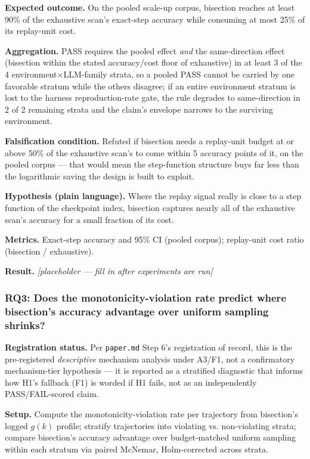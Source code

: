 \documentclass[11pt]{article}
\newcommand{\ph}{\textit{[placeholder --- fill in after experiments are run]}}
\begin{document}
\textbf{Expected outcome.} On the pooled scale-up corpus, bisection reaches at least 90\% of the exhaustive scan's exact-step accuracy while consuming at most 25\% of its replay-unit cost.

\textbf{Aggregation.} PASS requires the pooled effect \emph{and} the same-direction effect (bisection within the stated accuracy/cost floor of exhaustive) in at least 3 of the 4 environment$\times$LLM-family strata, so a pooled PASS cannot be carried by one favorable stratum while the others disagree; if an entire environment stratum is lost to the harness reproduction-rate gate, the rule degrades to same-direction in 2 of 2 remaining strata and the claim's envelope narrows to the surviving environment.

\textbf{Falsification condition.} Refuted if bisection needs a replay-unit budget at or above 50\% of the exhaustive scan's to come within 5 accuracy points of it, on the pooled corpus --- that would mean the step-function structure buys far less than the logarithmic saving the design is built to exploit.

\textbf{Hypothesis (plain language).} Where the replay signal really is close to a step function of the checkpoint index, bisection captures nearly all of the exhaustive scan's accuracy for a small fraction of its cost.

\textbf{Metrics.} Exact-step accuracy and 95\% CI (pooled corpus); replay-unit cost ratio (bisection / exhaustive).

\textbf{Result.} \ph

\subsubsection{RQ3: Does the monotonicity-violation rate predict where bisection's accuracy advantage over uniform sampling shrinks?}
\textbf{Registration status.} Per \texttt{paper.md} Step 6's registration of record, this is the pre-registered \emph{descriptive} mechanism analysis under A3/F1, not a confirmatory mechanism-tier hypothesis --- it is reported as a stratified diagnostic that informs how H1's fallback (F1) is worded if H1 fails, not as an independently PASS/FAIL-scored claim.

\textbf{Setup.} Compute the monotonicity-violation rate per trajectory from bisection's logged $g(k)$ profile; stratify trajectories into violating vs. non-violating strata; compare bisection's accuracy advantage over budget-matched uniform sampling within each stratum via paired McNemar, Holm-corrected across strata.
\end{document}
